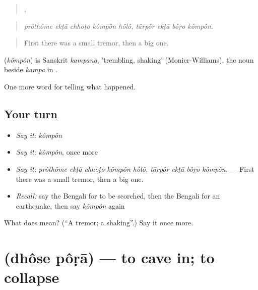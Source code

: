 \begin{quote}
    ,    
\end{quote}

\begin{quote}
\emph{prôthôme ekṭā chhoṭo kômpôn hôlô, tārpôr ekṭā bôṛo kômpôn.}
\end{quote}

\begin{quote}
First there was a small tremor, then a big one.
\end{quote}

\begin{cousinweb}
\textbf{} (\emph{kômpôn}) is Sanskrit \emph{kampana}, 'trembling, shaking' (Monier-Williams), the noun beside \emph{kampa} in \textbf{}.
\end{cousinweb}

\begin{grammarlens}[title={What you've built}]
One more word for telling what happened.
\end{grammarlens}

\subsection*{Your turn}
\begin{itemize}
\raggedright
  \item \emph{Say it:} \emph{kômpôn}
  \item \emph{Say it:} \emph{kômpôn}, once more
  \item \emph{Say it:} \emph{prôthôme ekṭā chhoṭo kômpôn hôlô, tārpôr ekṭā bôṛo kômpôn.} — First there was a small tremor, then a big one.
  \item \emph{Recall:} say the Bengali for to be scorched, then the Bengali for an earthquake, then say \emph{kômpôn} again
\end{itemize}

\begin{tcolorbox}[breakable,colback=teal!4,colframe=teal!35!black,title={Before you move on}]
What does  mean? (\textquotedblleft{}A tremor; a shaking\textquotedblright{}.) Say it once more.
\end{tcolorbox}
\section[\texorpdfstring{\bn{ধসে} \bn{পড়া} (dhôse pôṛā)}{ধসে পড়া (dhôse pôṛā)}]{  (dhôse pôṛā) — to cave in; to collapse}

